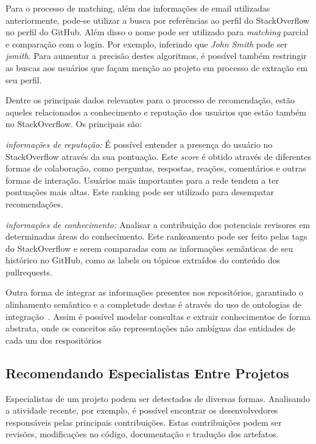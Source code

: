 \documentclass[sigconf]{acmart}
\begin{document}
Para o processo de matching, além das informações de email utilizadas anteriormente, pode-se utilizar a busca por referências ao perfil do StackOverflow no perfil do GitHub. Além disso o nome pode ser utilizado para \textit{matching} parcial e comparação com o login. Por exemplo, inferindo que \textit{John Smith} pode ser \textit{jsmith}. Para aumentar a precisão destes algoritmos, é possível também restringir as buscas aos usuários que façam menção ao projeto em processo de extração em seu perfil.

Dentre os principais dados relevantes para o processo de recomendação, estão aqueles relacionados a conhecimento e reputação dos usuários que estão também no StackOverflow. Os principais são:

\textit{informações de reputação: } É possível entender a presença do usuário no StackOverflow através da sua pontuação. Este \textit{score} é obtido através de diferentes formas de colaboração, como perguntas, respostas, reações, comentários e outras formas de interação. Usuários mais importantes para a rede tendem a ter pontuações mais altas. Este ranking pode ser utilizado para desempatar recomendações.

\textit{informações de conhecimento: } Analisar a contribuição dos potenciais revisores em determinadas áreas do conhecimento. Este rankeamento pode ser feito pelas tags do StackOverflow e serem comparadas com as informações semânticas de seu histórico no GitHub, como as labels ou tópicos extraídos do conteúdo dos pullrequests.

Outra forma de integrar as informações presentes nos repositórios, garantindo o alinhamento semântico e a completude destas é através do uso de ontologias de integração~\cite{pinto2001}. Assim é possível modelar consultas e extrair conhecimentos de forma abstrata, onde os conceitos são representações não ambíguas das entidades de cada um dos respositórios~\cite{calvanese2002}

\subsection{Recomendando Especialistas Entre Projetos}

Especialistas de um projeto podem ser detectados de diversas formas. Analisando a atividade recente, por exemplo, é possível encontrar os desenvolvedores responsáveis pelas principais contribuições. Estas contribuições podem ser revisões, modificações no código, documentação e tradução dos artefatos.
\end{document}
